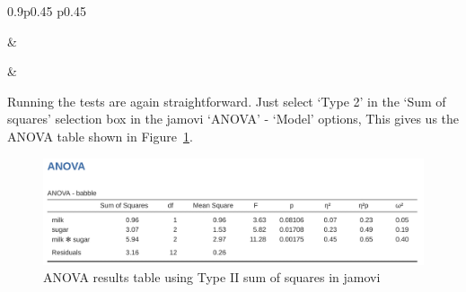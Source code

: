 \documentclass[
  a4paper,
]{book}
\begin{document}
\begin{table}[ht]
\caption{\label{tbl-tab14-28}Type II tests for the sugar x milk interaction term }\tabularnewline

\begin{centerbox}
\begin{threeparttable}
\setlength{\tabcolsep}{0pt}
\begin{tabularx}{0.9\textwidth}{p{} p{}}



 &
 \tabularnewline[-0.5pt]



 &
 \tabularnewline[-0.5pt]


\end{tabularx} 

\end{threeparttable}\par\end{centerbox}

\end{table}
 

Running the tests are again straightforward. Just select `Type 2' in the
`Sum of squares' selection box in the jamovi `ANOVA' - `Model' options,
This gives us the ANOVA table shown in Figure~\ref{fig-fig14-30}.

\begin{figure}

\includegraphics[width=1\textwidth,height=\textheight]{images/fig14-30.png} \hfill{}

\caption{\label{fig-fig14-30}ANOVA results table using Type II sum of
squares in jamovi}

\end{figure}
\end{document}
